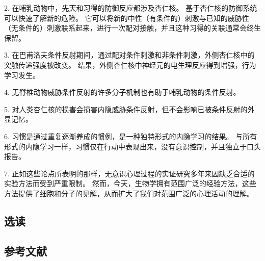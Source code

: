2. 在哺乳动物中，先天和习得的防御反应都涉及杏仁核。 基于杏仁核的防御系统可以快速了解新的危险。 它可以将新的中性（有条件的）刺激与已知的威胁性（无条件的）刺激联系起来，进行一次配对接触，并且这种习得的关联通常会终生保留。 

3. 在巴甫洛夫条件反射期间，通过配对条件刺激和非条件刺激，外侧杏仁核中的突触传递强度被改变。 结果，外侧杏仁核中神经元的电生理反应得到增强，行为学习发生。 

4. 无脊椎动物威胁条件反射的许多分子机制也有助于哺乳动物的条件反射。 

5. 对人类杏仁核的损害会损害内隐威胁条件反射，但不会影响已被条件反射的外显记忆。 

6. 习惯是通过重复逐渐养成的惯例，是一种独特形式的内隐学习的结果。 与所有形式的内隐学习一样，习惯仅在行动中表现出来，没有意识控制，并且独立于口头报告。 

7. 正如这些论点所表明的那样，无意识心理过程的实证研究多年来因缺乏合适的实验方法而受到严重限制。 然而，今天，生物学拥有范围广泛的经验方法，这些方法提供了细胞和分子的见解，从而扩大了我们对范围广泛的心理活动的理解。

\subsection{选读}
\subsection{参考文献}